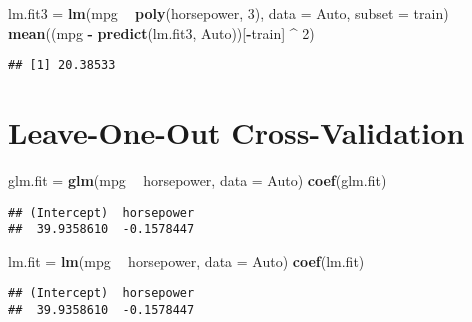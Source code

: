 \documentclass[
]{article}
\newenvironment{Shaded}{\begin{snugshade}}{\end{snugshade}}
\newcommand{\DataTypeTok}[1]{\textcolor[rgb]{0.13,0.29,0.53}{#1}}
\newcommand{\DecValTok}[1]{\textcolor[rgb]{0.00,0.00,0.81}{#1}}
\newcommand{\KeywordTok}[1]{\textcolor[rgb]{0.13,0.29,0.53}{\textbf{#1}}}
\newcommand{\NormalTok}[1]{#1}
\newcommand{\OperatorTok}[1]{\textcolor[rgb]{0.81,0.36,0.00}{\textbf{#1}}}
\newcommand{\StringTok}[1]{\textcolor[rgb]{0.31,0.60,0.02}{#1}}
\begin{document}
\begin{Shaded}
\begin{Highlighting}[]
\NormalTok{lm.fit3 =}\StringTok{ }\KeywordTok{lm}\NormalTok{(mpg }\OperatorTok{~}\StringTok{ }\KeywordTok{poly}\NormalTok{(horsepower, }\DecValTok{3}\NormalTok{), }\DataTypeTok{data =}\NormalTok{ Auto, }\DataTypeTok{subset =}\NormalTok{ train)}
\KeywordTok{mean}\NormalTok{((mpg }\OperatorTok{-}\StringTok{ }\KeywordTok{predict}\NormalTok{(lm.fit3, Auto))[}\OperatorTok{-}\NormalTok{train] }\OperatorTok{^}\StringTok{ }\DecValTok{2}\NormalTok{)}
\end{Highlighting}
\end{Shaded}

\begin{verbatim}
## [1] 20.38533
\end{verbatim}

\hypertarget{leave-one-out-cross-validation}{%
\section{Leave-One-Out
Cross-Validation}\label{leave-one-out-cross-validation}}

\begin{Shaded}
\begin{Highlighting}[]
\NormalTok{glm.fit =}\StringTok{ }\KeywordTok{glm}\NormalTok{(mpg }\OperatorTok{~}\StringTok{ }\NormalTok{horsepower, }\DataTypeTok{data =}\NormalTok{ Auto)}
\KeywordTok{coef}\NormalTok{(glm.fit)}
\end{Highlighting}
\end{Shaded}

\begin{verbatim}
## (Intercept)  horsepower 
##  39.9358610  -0.1578447
\end{verbatim}

\begin{Shaded}
\begin{Highlighting}[]
\NormalTok{lm.fit =}\StringTok{ }\KeywordTok{lm}\NormalTok{(mpg }\OperatorTok{~}\StringTok{ }\NormalTok{horsepower, }\DataTypeTok{data =}\NormalTok{ Auto)}
\KeywordTok{coef}\NormalTok{(lm.fit)}
\end{Highlighting}
\end{Shaded}

\begin{verbatim}
## (Intercept)  horsepower 
##  39.9358610  -0.1578447
\end{verbatim}

\begin{Shaded}
\end{Shaded}
\end{document}
